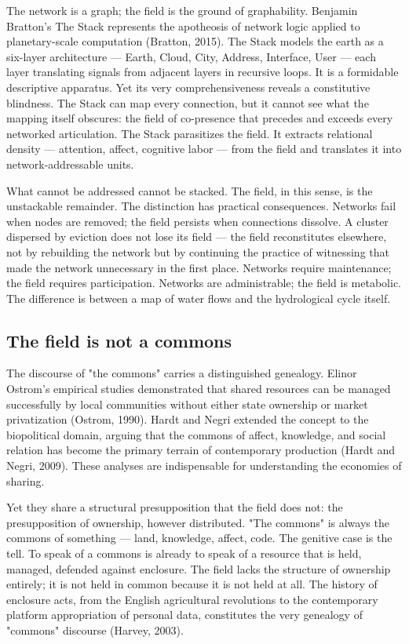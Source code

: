 The network is a graph; the field is the ground of graphability. Benjamin Bratton's The Stack represents the apotheosis of network logic applied to planetary-scale computation (Bratton, 2015). The Stack models the earth as a six-layer architecture — Earth, Cloud, City, Address, Interface, User — each layer translating signals from adjacent layers in recursive loops. It is a formidable descriptive apparatus. Yet its very comprehensiveness reveals a constitutive blindness. The Stack can map every connection, but it cannot see what the mapping itself obscures: the field of co-presence that precedes and exceeds every networked articulation. The Stack parasitizes the field. It extracts relational density — attention, affect, cognitive labor — from the field and translates it into network-addressable units.

What cannot be addressed cannot be stacked. The field, in this sense, is the unstackable remainder. The distinction has practical consequences. Networks fail when nodes are removed; the field persists when connections dissolve. A cluster dispersed by eviction does not lose its field — the field reconstitutes elsewhere, not by rebuilding the network but by continuing the practice of witnessing that made the network unnecessary in the first place. Networks require maintenance; the field requires participation. Networks are administrable; the field is metabolic. The difference is between a map of water flows and the hydrological cycle itself.

\subsection{The field is not a commons}

The discourse of "the commons" carries a distinguished genealogy. Elinor Ostrom's empirical studies demonstrated that shared resources can be managed successfully by local communities without either state ownership or market privatization (Ostrom, 1990). Hardt and Negri extended the concept to the biopolitical domain, arguing that the commons of affect, knowledge, and social relation has become the primary terrain of contemporary production (Hardt and Negri, 2009). These analyses are indispensable for understanding the economies of sharing.

Yet they share a structural presupposition that the field does not: the presupposition of ownership, however distributed. "The commons" is always the commons of something — land, knowledge, affect, code. The genitive case is the tell. To speak of a commons is already to speak of a resource that is held, managed, defended against enclosure. The field lacks the structure of ownership entirely; it is not held in common because it is not held at all. The history of enclosure acts, from the English agricultural revolutions to the contemporary platform appropriation of personal data, constitutes the very genealogy of "commons" discourse (Harvey, 2003).

